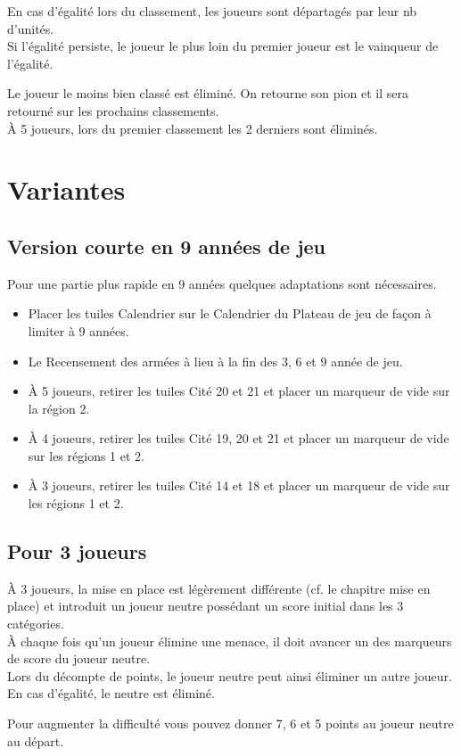 \documentclass[10pt, a4paper]{article}	%
\begin{document}
\begin{multicols}{3}
En cas d'égalité lors du classement, les joueurs sont départagés par leur nb d'unités.\\
Si l'égalité persiste, le joueur le plus loin du premier joueur est le vainqueur de l'égalité.

Le joueur le moins bien classé est éliminé. On retourne son pion et il sera retourné sur les prochains classements.\\
À 5 joueurs, lors du premier classement les 2 derniers sont éliminés.

\section{Variantes} %
\label{sec:variantes}

\subsection{Version courte en 9 années de jeu} %
\label{sub:version_courte_9_annees}
Pour une partie plus rapide en 9 années quelques adaptations sont nécessaires.\\
\begin{itemize}
	\item Placer les tuiles Calendrier sur le Calendrier du Plateau de jeu de façon à limiter à 9 années.
	\item Le Recensement des armées à lieu à la fin des 3\ieme{}, 6\ieme{} et 9\ieme{} année de jeu.
	\item À 5 joueurs, retirer les tuiles Cité 20 et 21 et placer un marqueur de vide sur la région 2.
	\item À 4 joueurs, retirer les tuiles Cité 19, 20 et 21 et placer un marqueur de vide sur les régions 1 et 2.
	\item À 3 joueurs, retirer les tuiles Cité 14 et 18 et placer un marqueur de vide sur les régions 1 et 2.
\end{itemize}

\subsection{Pour 3 joueurs} %
\label{sub:regles_3_joueurs}
À 3 joueurs, la mise en place est légèrement différente (cf. le chapitre mise en place) et introduit un joueur neutre possédant un score initial dans les 3 catégories.\\
À chaque fois qu’un joueur élimine une menace, il doit avancer un des marqueurs de score du joueur neutre.\\
Lors du décompte de points, le joueur neutre peut ainsi éliminer un autre joueur. En cas d’égalité, le neutre est éliminé.

Pour augmenter la difficulté vous pouvez donner 7, 6 et 5 points au joueur neutre au départ.

\end{multicols}
\end{document}
